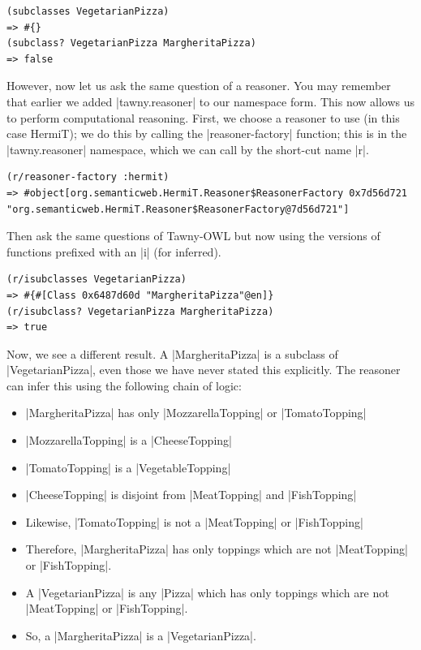 \begin{verbatim}
(subclasses VegetarianPizza)
=> #{}
(subclass? VegetarianPizza MargheritaPizza)
=> false
\end{verbatim}

However, now let us ask the same question of a reasoner. You may
remember that earlier we added |tawny.reasoner| to our namespace
form. This now allows us to perform computational reasoning.  First,
we choose a reasoner to use (in this case HermiT); we do this by
calling the |reasoner-factory| function; this is in the
|tawny.reasoner| namespace, which we can call by the short-cut name |r|.

\begin{verbatim}
(r/reasoner-factory :hermit)
=> #object[org.semanticweb.HermiT.Reasoner$ReasonerFactory 0x7d56d721 "org.semanticweb.HermiT.Reasoner$ReasonerFactory@7d56d721"]
\end{verbatim}

Then ask the same questions of Tawny-OWL but now using the versions of
functions prefixed with an |i| (for inferred).

\begin{verbatim}
(r/isubclasses VegetarianPizza)
=> #{#[Class 0x6487d60d "MargheritaPizza"@en]}
(r/isubclass? VegetarianPizza MargheritaPizza)
=> true
\end{verbatim}

Now, we see a different result. A |MargheritaPizza| is a subclass of
|VegetarianPizza|, even those we have never stated this explicitly.
The reasoner can infer this using the following chain of logic:

\begin{itemize}
\item |MargheritaPizza| has only |MozzarellaTopping| or |TomatoTopping|
\item |MozzarellaTopping| is a |CheeseTopping|
\item |TomatoTopping| is a |VegetableTopping|
\item |CheeseTopping| is disjoint from |MeatTopping| and |FishTopping|
\item Likewise, |TomatoTopping| is not a |MeatTopping| or |FishTopping|
\item Therefore, |MargheritaPizza| has only toppings which are not
  |MeatTopping| or |FishTopping|.
\item A |VegetarianPizza| is any |Pizza| which has only toppings which are not
  |MeatTopping| or |FishTopping|.
\item So, a |MargheritaPizza| is a |VegetarianPizza|.
\end{itemize}

